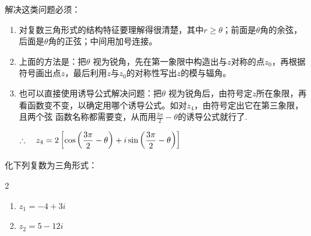 \begin{rmk}
    解决这类问题必须：
\begin{enumerate}[(1)]
\item 对复数三角形式的结构特征要理解得很清楚，其中$r\ge \theta$；前面是$\theta$角的余弦，后面是$\theta$角的正弦；中间用加号连接。
\item 上面的方法是：把$\theta$ 视为锐角，先在第一象限中构造出与$z$对称的点$z_0$，再根据符号画出点$z$，最后利用$z$与$z_0$的对称性写出$z$的模与辐角。
\item 也可以直接使用诱导公式解决问题：把$\theta$ 视为锐角后，由符号定$z$所在象限，再看函数变不变，以确定用哪个诱导公式。如对$z_4$，由符号定出它在第三象限，且两个弦
函数名称都需要变，从而用$\frac{3\pi}{2}-\theta$的诱导公式就行了.   

$\therefore\quad z_4=2\left[\cos\left(\dfrac{3\pi}{2}-\theta\right)+i\sin\left(\dfrac{3\pi}{2}-\theta\right)\right]$
\end{enumerate}
\end{rmk}

\begin{example}
化下列复数为三角形式：
\begin{multicols}{2}
\begin{enumerate}[(1)]
    \item $z_1=-4+3i$
    \item $z_2=5-12i$
\end{enumerate}
\end{multicols}
\end{example}

